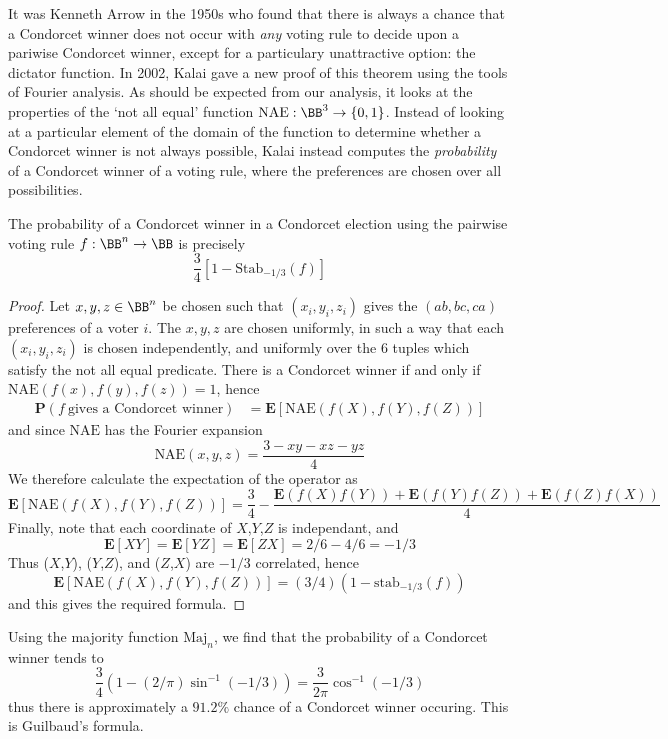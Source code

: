 It was Kenneth Arrow in the 1950s who found that there is always a chance that a Condorcet winner does not occur with {\it any} voting rule to decide upon a pariwise Condorcet winner, except for a particulary unattractive option: the dictator function. In 2002, Kalai gave a new proof of this theorem using the tools of Fourier analysis. As should be expected from our analysis, it looks at the properties of the `not all equal' function $\text{NAE}: \BB^3 \to \{ 0, 1 \}$. Instead of looking at a particular element of the domain of the function to determine whether a Condorcet winner is not always possible, Kalai instead computes the {\it probability} of a Condorcet winner of a voting rule, where the preferences are chosen over all possibilities. 

\begin{lemma}
    The probability of a Condorcet winner in a Condorcet election using the pairwise voting rule $f: \BB^n \to \BB$ is precisely
    \[ \frac{3}{4} [1 - \text{Stab}_{-1/3}(f)] \]
\end{lemma}
\begin{proof}
    Let $x,y,z \in \BB^n$ be chosen such that $(x_i,y_i,z_i)$ gives the $(ab,bc,ca)$ preferences of a voter $i$. The $x,y,z$ are chosen uniformly, in such a way that each $(x_i,y_i,z_i)$ is chosen independently, and uniformly over the 6 tuples which satisfy the not all equal predicate. There is a Condorcet winner if and only if $\text{NAE}(f(x),f(y),f(z)) = 1$, hence
    \begin{align*}
        \mathbf{P}(f\ \text{gives a Condorcet winner}) &= \mathbf{E}[\text{NAE}(f(X),f(Y),f(Z))]
    \end{align*}
    and since $\text{NAE}$ has the Fourier expansion
    \[ \text{NAE}(x,y,z) = \frac{3 - xy - xz - yz}{4} \]
    We therefore calculate the expectation of the operator as
    \[ \mathbf{E}[\text{NAE}(f(X),f(Y),f(Z))] = \frac{3}{4} - \frac{\mathbf{E}(f(X)f(Y)) + \mathbf{E}(f(Y)f(Z)) + \mathbf{E}(f(Z)f(X))}{4} \]
    Finally, note that each coordinate of $X$,$Y$,$Z$ is independant, and
    \[ \mathbf{E}[XY] = \mathbf{E}[YZ] = \mathbf{E}[ZX] = 2/6 - 4/6 = -1/3 \]
    Thus ($X$,$Y$), ($Y$,$Z$), and ($Z$,$X$) are $-1/3$ correlated, hence
    \[ \mathbf{E}[\text{NAE}(f(X),f(Y),f(Z))] = (3/4)(1 - \text{stab}_{-1/3}(f)) \]
    and this gives the required formula.
\end{proof}

\begin{example}
    Using the majority function $\text{Maj}_n$, we find that the probability of a Condorcet winner tends to
    \[ \frac{3}{4}(1 - (2/\pi) \sin^{-1}(-1/3)) = \frac{3}{2\pi} \cos^{-1}(-1/3) \]
    thus there is approximately a $91.2\%$ chance of a Condorcet winner occuring. This is Guilbaud's formula.
\end{example}

